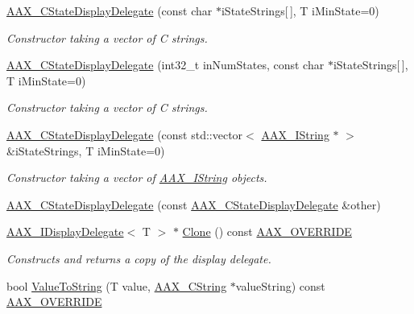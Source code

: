 \begin{DoxyCompactItemize}
\item 
\mbox{\hyperlink{a01561_a307685fc5172fec5ccfba138f9f4c8ec}{A\+A\+X\+\_\+\+C\+State\+Display\+Delegate}} (const char $\ast$i\+State\+Strings\mbox{[}$\,$\mbox{]}, T i\+Min\+State=0)
\begin{DoxyCompactList}\small\item\em Constructor taking a vector of C strings. \end{DoxyCompactList}\item 
\mbox{\hyperlink{a01561_ae9b9b548d196af94bc7392208da8adfe}{A\+A\+X\+\_\+\+C\+State\+Display\+Delegate}} (int32\+\_\+t in\+Num\+States, const char $\ast$i\+State\+Strings\mbox{[}$\,$\mbox{]}, T i\+Min\+State=0)
\begin{DoxyCompactList}\small\item\em Constructor taking a vector of C strings. \end{DoxyCompactList}\item 
\mbox{\hyperlink{a01561_a9c5b254c68a200198a599026a76e1945}{A\+A\+X\+\_\+\+C\+State\+Display\+Delegate}} (const std\+::vector$<$ \mbox{\hyperlink{a01873}{A\+A\+X\+\_\+\+I\+String}} $\ast$ $>$ \&i\+State\+Strings, T i\+Min\+State=0)
\begin{DoxyCompactList}\small\item\em Constructor taking a vector of \mbox{\hyperlink{a01873}{A\+A\+X\+\_\+\+I\+String}} objects. \end{DoxyCompactList}\item 
\mbox{\hyperlink{a01561_af6651ca6959ea8963c91f89390ff9e35}{A\+A\+X\+\_\+\+C\+State\+Display\+Delegate}} (const \mbox{\hyperlink{a01561}{A\+A\+X\+\_\+\+C\+State\+Display\+Delegate}} \&other)
\item 
\mbox{\hyperlink{a01801}{A\+A\+X\+\_\+\+I\+Display\+Delegate}}$<$ T $>$ $\ast$ \mbox{\hyperlink{a01561_ad6e328d8784aaccc960da70f51f040a3}{Clone}} () const \mbox{\hyperlink{a00392_ac2f24a5172689ae684344abdcce55463}{A\+A\+X\+\_\+\+O\+V\+E\+R\+R\+I\+DE}}
\begin{DoxyCompactList}\small\item\em Constructs and returns a copy of the display delegate. \end{DoxyCompactList}\item 
bool \mbox{\hyperlink{a01561_aa8c3a9028d0fcf4bb2a95390de8049fa}{Value\+To\+String}} (T value, \mbox{\hyperlink{a01573}{A\+A\+X\+\_\+\+C\+String}} $\ast$value\+String) const \mbox{\hyperlink{a00392_ac2f24a5172689ae684344abdcce55463}{A\+A\+X\+\_\+\+O\+V\+E\+R\+R\+I\+DE}}

\end{DoxyCompactItemize}
